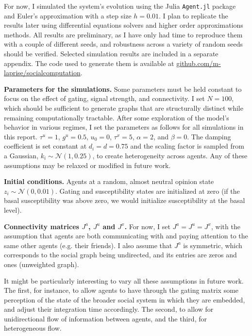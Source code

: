 \documentclass[]{article}
\begin{document}
For now, I simulated the system's evolution using the Julia \texttt{Agent.jl} package and Euler's approximation with a step size $h = 0.01$. I plan to replicate the results later using differential equations solvers and higher order approximations methods. All results are preliminary, as I have only had time to reproduce them with a couple of different seeds, and robustness across a variety of random seeds should be verified. Selected simulation results are included in a separate appendix. The code used to generate them is available at \href{http://github.com/m-laprise/socialcomputation}{github.com/m-laprise/socialcomputation}.

\textbf{Parameters for the simulations.} Some parameters must be held constant to focus on the effect of gating, signal strength, and connectivity. I set $N = 100$, which should be sufficient to generate graphs that are structurally distinct while remaining computationally tractable. After some exploration of the model's behavior in various regimes, I set the parameters as follows for all simulations in this report. $\tau^u = 1$, $g^u = 0.5$, $u_0=0$, $\tau^x = 5$, $\alpha = 2$, and $\beta = 0$. The damping coefficient is set constant at $d_i = d = 0.75$ and the scaling factor is sampled from a Gaussian, $k_i \sim \mathcal{N}(1,0.25)$, to create heterogeneity across agents. Any of these assumptions may be relaxed or modified in future work. 

\textbf{Initial conditions.} Agents at a random, almost neutral opinion state $z_i \sim \mathcal{N}(0, 0.01)$. Gating and susceptibility states are initialized at zero (if the basal susceptibility was above zero, we would initialize susceptibility at the basal level).

\textbf{Connectivity matrices $J^a$, $J^u$ and $J^x$.} For now, I set $J^a = J^u = J^x$, with the assumption that agents are both communicating with and paying attention to the same other agents (e.g. their friends). I also assume that $J^a$ is symmetric, which corresponds to the social graph being undirected, and its entries are zeros and ones (unweighted graph).

It might be particularly interesting to vary all these assumptions in future work. The first, for instance, to allow agents to have through the gating matrix some perception of the state of the broader social system in which they are embedded, and adjust their integration time accordingly. The second, to allow for unidirectional flow of information between agents, and the third, for heterogeneous flow.
\end{document}
